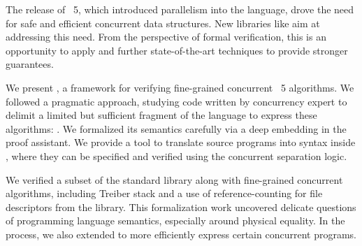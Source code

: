 The release of \OCaml~5, which introduced parallelism into the language, drove the need for safe and efficient concurrent data structures.
New libraries like \Saturn aim at addressing this need.
From the perspective of formal verification, this is an opportunity to apply and further state-of-the-art techniques to provide stronger guarantees.

We present \Zoo, a framework for verifying fine-grained concurrent \OCaml~5 algorithms.
We followed a pragmatic approach, studying \OCaml code written by concurrency expert to delimit a limited but sufficient fragment of the language to express these algorithms: \ZooLang.
We formalized its semantics carefully via a deep embedding in the \Rocq proof assistant.
We provide a tool to translate source \OCaml programs into \ZooLang syntax inside \Rocq, where they can be specified and verified using the \Iris concurrent separation logic.

We verified a subset of the standard library along with fine-grained concurrent algorithms, including Treiber stack and a use of reference-counting for file descriptors from the \Eio library.
This formalization work uncovered delicate questions of programming language semantics, especially around physical equality.
In the process, we also extended \OCaml to more efficiently express certain concurrent programs.
